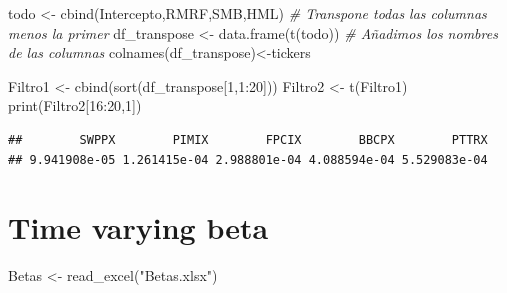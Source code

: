 \documentclass[
  12pt,
]{article}
\newenvironment{Shaded}{\begin{snugshade}}{\end{snugshade}}
\newcommand{\CommentTok}[1]{\textcolor[rgb]{0.56,0.35,0.01}{\textit{#1}}}
\newcommand{\DecValTok}[1]{\textcolor[rgb]{0.00,0.00,0.81}{#1}}
\newcommand{\FunctionTok}[1]{\textcolor[rgb]{0.00,0.00,0.00}{#1}}
\newcommand{\NormalTok}[1]{#1}
\newcommand{\OtherTok}[1]{\textcolor[rgb]{0.56,0.35,0.01}{#1}}
\newcommand{\SpecialCharTok}[1]{\textcolor[rgb]{0.00,0.00,0.00}{#1}}
\newcommand{\StringTok}[1]{\textcolor[rgb]{0.31,0.60,0.02}{#1}}
\begin{document}
\begin{Shaded}
\begin{Highlighting}[]
\NormalTok{todo }\OtherTok{\textless{}{-}} \FunctionTok{cbind}\NormalTok{(Intercepto,RMRF,SMB,HML)}
\CommentTok{\# Transpone todas las columnas menos la primer}
\NormalTok{df\_transpose }\OtherTok{\textless{}{-}} \FunctionTok{data.frame}\NormalTok{(}\FunctionTok{t}\NormalTok{(todo))}
\CommentTok{\# Añadimos los nombres de las columnas}
\FunctionTok{colnames}\NormalTok{(df\_transpose)}\OtherTok{\textless{}{-}}\NormalTok{tickers}
\end{Highlighting}
\end{Shaded}

\begin{Shaded}
\begin{Highlighting}[]
\NormalTok{Filtro1 }\OtherTok{\textless{}{-}} \FunctionTok{cbind}\NormalTok{(}\FunctionTok{sort}\NormalTok{(df\_transpose[}\DecValTok{1}\NormalTok{,}\DecValTok{1}\SpecialCharTok{:}\DecValTok{20}\NormalTok{]))}
\NormalTok{Filtro2 }\OtherTok{\textless{}{-}} \FunctionTok{t}\NormalTok{(Filtro1)}
\FunctionTok{print}\NormalTok{(Filtro2[}\DecValTok{16}\SpecialCharTok{:}\DecValTok{20}\NormalTok{,}\DecValTok{1}\NormalTok{])}
\end{Highlighting}
\end{Shaded}

\begin{verbatim}
##        SWPPX        PIMIX        FPCIX        BBCPX        PTTRX 
## 9.941908e-05 1.261415e-04 2.988801e-04 4.088594e-04 5.529083e-04
\end{verbatim}

\hypertarget{time-varying-beta}{%
\section{Time varying beta}\label{time-varying-beta}}

\begin{Shaded}
\begin{Highlighting}[]
\NormalTok{Betas }\OtherTok{\textless{}{-}} \FunctionTok{read\_excel}\NormalTok{(}\StringTok{"Betas.xlsx"}\NormalTok{)}
\end{Highlighting}
\end{Shaded}
\end{document}
